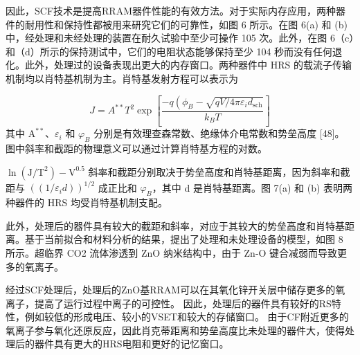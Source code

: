 因此，SCF技术是提高RRAM器件性能的有效方法。对于实际内存应用，两种器件的耐用性和保持性都被用来研究它们的可靠性，如图 6 所示。在图 6(a) 和 (b) 中，经处理和未经处理的装置在耐久试验中至少可操作 105 次。此外，在图 6（c）和（d）所示的保持测试中，它们的电阻状态能够保持至少 104 秒而没有任何退化。此外，处理过的设备表现出更大的内存窗口。两种器件中 HRS 的载流子传输机制均以肖特基机制为主。肖特基发射方程可以表示为

$$
J=A^{* *} T^2 \exp \left[\frac{-q\left(\phi_B-\sqrt{q V / 4 \pi \varepsilon_i d_{\mathrm{sch}}}\right.}{k_B T}\right]
$$
其中 $\mathrm{A}^{* *}$、$\varepsilon_i$ 和 $\varphi_B$ 分别是有效理查森常数、绝缘体介电常数和势垒高度 [48]。
图中斜率和截距的物理意义可以通过计算肖特基方程的对数。


$\ln \left(\mathrm{J} / \mathrm{T}^2\right)-\mathrm{V}^{0.5}$ 
斜率和截距分别取决于势垒高度和肖特基距离，因为斜率和截距与 $\left(\left(1 / \varepsilon_id\right)\right)^{1 / 2}$ 成正比和 $\varphi_B$，其中 d 是肖特基距离。图 7(a) 和 (b) 表明两种器件的 HRS 均受肖特基机制支配。

此外，处理后的器件具有较大的截距和斜率，对应于其较大的势垒高度和肖特基距离。基于当前拟合和材料分析的结果，提出了处理和未处理设备的模型，如图 8 所示。超临界 CO2 流体渗透到 ZnO 纳米结构中，由于 Zn-O 键合减弱而导致更多的氧离子。

经过SCF处理后，处理后的ZnO基RRAM可以在其氧化锌开关层中储存更多的氧离子，提高了运行过程中离子的可控性。
因此，处理后的器件具有较好的RS特性，例如较低的形成电压、较小的VSET和较大的存储窗口。
由于CF附近更多的氧离子参与氧化还原反应，因此肖克蒂距离和势垒高度比未处理的器件大，使得处理后的器件具有更大的HRS电阻和更好的记忆窗口。







